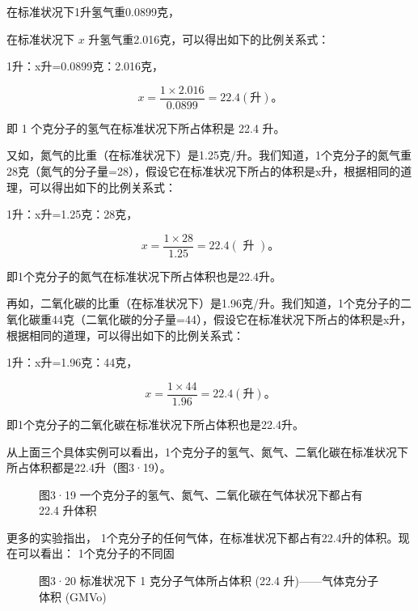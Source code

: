 在标准状况下1升氢气重0.0899克，

在标准状况下 \(x\) 升氢气重2.016克，可以得出如下的比例关系式：

1升：x升=0.0899克：2.016克，

\[
x = \frac {1 \times 2.016}{0.0899} = 22.4 (\text{升})\text{。}
\]

即 1 个克分子的氢气在标准状况下所占体积是 22.4 升。

又如，氮气的比重（在标准状况下）是1.25克/升。我们知道，1个克分子的氮气重28克（氮气的分子量=28），假设它在标准状况下所占的体积是x升，根据相同的道理，可以得出如下的比例关系式：

1升：x升=1.25克：28克，

\[
x = \frac {1 \times 28}{1.25} = 22.4 (\text{ 升 })\text{。}
\]

即1个克分子的氮气在标准状况下所占体积也是22.4升。

再如，二氧化碳的比重（在标准状况下）是1.96克/升。我们知道，1个克分子的二氧化碳重44克（二氧化碳的分子量=44），假设它在标准状况下所占的体积是x升，根据相同的道理，可以得出如下的比例关系式：

1升：x升=1.96克：44克，

\[
x = \frac {1 \times 44}{1.96} = 22.4 (\text{升})\text{。}
\]

即1个克分子的二氧化碳在标准状况下所占体积也是22.4升。

从上面三个具体实例可以看出，1个克分子的氢气、氮气、二氧化碳在标准状况下所占体积都是22.4升（图3·19）。

\begin{figure}
\centering
\caption{图3·19 一个克分子的氢气、氮气、二氧化碳在气体状况下都占有 22.4
升体积}
\end{figure}

更多的实验指出，
1个克分子的任何气体，在标准状况下都占有22.4升的体积。现在可以看出：
1个克分子的不同固

\begin{figure}
\centering
\caption{图3·20 标准状况下 1 克分子气体所占体积 (22.4
升)------气体克分子体积 (GMVo)}
\end{figure}

